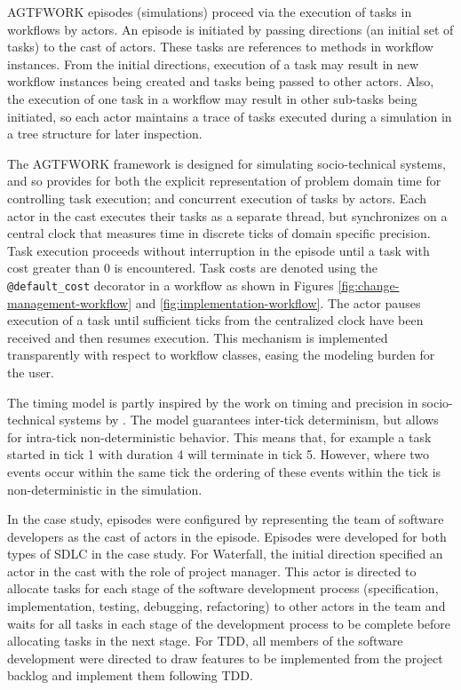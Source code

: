 \documentclass{llncs}
\begin{document}
AGTFWORK episodes (simulations) proceed via the execution of tasks in workflows by actors.  An episode is initiated by
passing directions (an initial set of tasks) to the cast of actors.  These tasks are references to methods in workflow
instances.  From the initial directions, execution of a task may result in new workflow instances being created and
tasks being passed to other actors.  Also, the execution of one task in a workflow may result in other sub-tasks being
initiated, so each actor maintains a trace of tasks executed during a simulation in a tree structure for later
inspection.

The AGTFWORK framework is designed for simulating socio-technical systems, and so provides for both the explicit
representation of problem domain time for controlling task execution; and concurrent execution of tasks by actors.  Each
actor in the cast executes their tasks as a separate thread, but synchronizes on a central clock that measures time in
discrete ticks of domain specific precision.  Task execution proceeds without interruption in the episode until a task
with cost greater than 0 is encountered.  Task costs are denoted using the \lstinline!@default_cost! decorator in a
workflow as shown in Figures \ref{fig:change-management-workflow} and \ref{fig:implementation-workflow}.  The actor
pauses execution of a task until sufficient ticks from the centralized clock have been received and then resumes
execution.  This mechanism is implemented transparently with respect to workflow classes, easing the modeling burden for
the user.

The timing model is partly inspired by the work on timing and precision in socio-technical systems by
\citet{baxter07evaluating}.  The model guarantees inter-tick determinism, but allows for intra-tick non-deterministic
behavior.  This means that, for example a task started in tick 1 with duration 4 will terminate in tick 5.  However,
where two events occur within the same tick the ordering of these events within the tick is non-deterministic in the
simulation.

In the case study, episodes were configured by representing the team of software developers as the cast of actors in the
episode.  Episodes were developed for both types of SDLC in the case study.  For Waterfall, the initial direction
specified an actor in the cast with the role of project manager.  This actor is directed to allocate tasks for each
stage of the software development process (specification, implementation, testing, debugging, refactoring) to other
actors in the team and waits for all tasks in each stage of the development process to be complete before allocating
tasks in the next stage.  For TDD, all members of the software development were directed to draw features to be
implemented from the project backlog and implement them following TDD.
\end{document}
